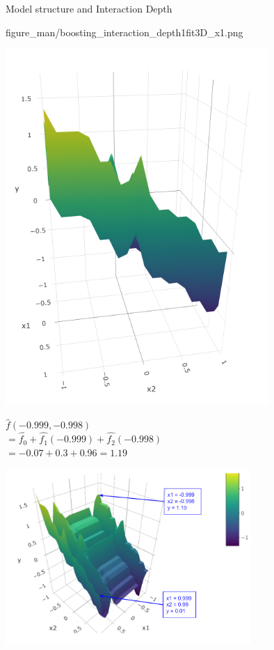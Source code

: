 \documentclass[11pt,compress,t,notes=noshow, xcolor=table]{beamer}
\begin{document}
\begin{vbframe}{Model structure and Interaction Depth}
\begin{minipage}[c]{0.3\textwidth}
{  figure_man/boosting_interaction_depth1fit3D_x1.png}
\end{minipage}%
\begin{minipage}[c]{0.3\textwidth}
  \includegraphics[width=0.75\textwidth, trim = 0 70 0 30, clip]{
  figure_man/boosting_interaction_depth1fit3D_x2.png}
\end{minipage}%

\vfill

\begin{minipage}[c]{0.4\textwidth}
  \footnotesize
  $\hat{f}(-0.999,-0.998)$\\
  $= \hat{f_0} + \hat{f_1}(-0.999) + \hat{f_2}(-0.998)$ \\
  $= -0.07 + 0.3 + 0.96 = 1.19$
\end{minipage}%
\begin{minipage}[c]{0.6\textwidth}  
  \centering
  \includegraphics[width=0.7\textwidth]{figure/interaction_td1_d3.png}
\end{minipage}%


\end{vbframe}
\end{document}
